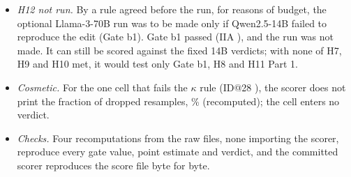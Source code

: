\begin{itemize}
  \item \emph{H12 not run.} By a rule agreed before the run, for reasons of budget, the optional Llama-3-70B run was to be made only if Qwen2.5-14B failed to reproduce the edit (Gate b1). Gate b1 passed (IIA \PkGatebOneBind{}), and the run was not made. It can still be scored against the fixed 14B verdicts; with none of H7, H9 and H10 met, it would test only Gate b1, H8 and H11 Part 1.
  \item \emph{Cosmetic.} For the one cell that fails the $\kappa$ rule (ID@28 \fmtLetter{}), the scorer does not print the fraction of dropped resamples, \PkDropIdTwentyeightLetter{}\% (recomputed); the cell enters no verdict.
  \item \emph{Checks.} Four recomputations from the raw files, none importing the scorer, reproduce every gate value, point estimate and verdict, and the committed scorer reproduces the score file byte for byte.
\end{itemize}

